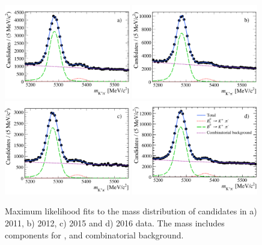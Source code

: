 \begin{figure}[tbp]
  \centering
    \includegraphics[width=0.49\textwidth]{./Figs/LifetimeMeasurement/Bd2KPi_2011_mass_fit.pdf}
    \includegraphics[width=0.49\textwidth]{./Figs/LifetimeMeasurement/Bd2KPi_2012_mass_fit.pdf}
    \includegraphics[width=0.49\textwidth]{./Figs/LifetimeMeasurement/Bd2KPi_2015_mass_fit.pdf}
    \includegraphics[width=0.49\textwidth]{./Figs/LifetimeMeasurement/Bd2KPi_2016_mass_fit.pdf}
  \caption{Maximum likelihood fits to the mass distribution of \bdkpi candidates in a) 2011, b) 2012, c) 2015 and d) 2016 data. The mass \pdf includes components for \bdkpi, \bskpi and combinatorial background.}
  \label{fig:ntracksmassifts}
\end{figure}



